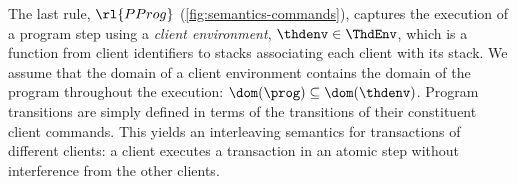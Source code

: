 
The last rule, \( \rl{PProg} \) (\cref{fig:semantics-commands}),
captures the execution of a program step 
using a \emph{client environment}, \(\thdenv \in \ThdEnv\), 
which is a function from client identifiers to stacks  associating each client with its stack. 
We assume that the domain of a client environment contains 
the domain of the program throughout the execution: 
\(\dom(\prog) \subseteq \dom(\thdenv)\).
Program transitions are simply defined in terms of the transitions of
their constituent client commands. 
This yields an interleaving semantics for transactions of different clients:  
a client executes a transaction in an atomic step without
interference from the other clients. 
